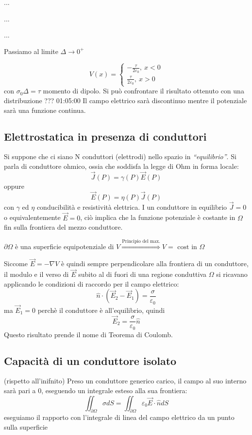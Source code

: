 ...

...

...

Passiamo al limite $\Delta \to 0^+$

$$
V(x) = \begin{cases}
-\frac{\tau}{2\varepsilon_0},\ x < 0 \\
\frac{\tau}{2\varepsilon_0},\ x > 0
\end{cases}
$$
con $\sigma_0 \Delta = \tau $ momento di dipolo.
Si può confrontare il risultato ottenuto con una distribuzione ??? 01:05:00
Il campo elettrico sarà discontinuo mentre il potenziale sarà una funzione continua.

\subsection{Elettrostatica in presenza di conduttori}
Si suppone che ci siano N conduttori (elettrodi) nello spazio in \textit{``equilibrio''}.
Si parla di conduttore ohmico, ossia che soddisfa la legge di Ohm in forma locale:
$$
\vec{J}(P) = \gamma(P)\vec{E}(P)
$$
oppure
$$
\vec{E}(P) = \eta(P)\vec{J}(P)
$$
con $\gamma$ ed $\eta$ conducibilità e resistività elettrica.
I un conduttore in equilibrio $\vec{J} = 0$ o equivalentemente $\vec{E} = 0$, ciò implica 
che la funzione potenziale è costante in $\Omega$ fin sulla frontiera del mezzo conduttore.

$\partial \Omega$ è una superficie equipotenziale di $V \stackrel{\text{Principio del max.}}{\Rightarrow} V = \text{ cost in } \Omega$

Siccome $\vec{E} = -\nabla V$ è quindi sempre perpendicolare alla frontiera di un conduttore,
il modulo e il verso di $\vec{E}$ subito al di fuori di una regione conduttiva $\Omega$ 
si ricavano applicando le condizioni di raccordo per il campo elettrico:
$$
\hat{n}\cdot (\vec{E}_2-\vec{E}_1) = \frac{\sigma}{\varepsilon_0}
$$
ma $\vec{E}_1 = 0$ perchè il conduttore è all'equilibrio, quindi 
$$
\vec{E}_2 = \frac{\sigma}{\varepsilon_0} \hat{n}
$$
Questo risultato prende il nome di Teorema di Coulomb.



\subsection{Capacità di un conduttore isolato} (rispetto all'inifnito)
Preso un conduttore generico carico, il campo al suo interno sarà pari a 0, eseguendo un integrale
esteso alla sua frontiera:
$$
\iint_{\partial \Omega}\sigma dS = \iint_{\partial \Omega} \varepsilon_0 \vec{E}\cdot \hat{n} dS
$$
eseguiamo il rapporto con l'integrale di linea del campo elettrico da un punto sulla superficie

